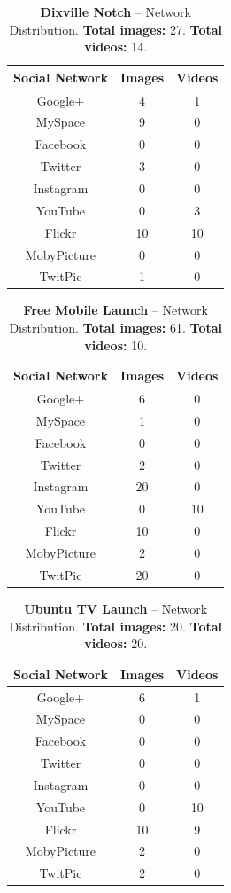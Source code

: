 \documentclass{acm_proc_article-sp}
\begin{document}
\begin{table}[htbp]
  \begin{tabular}{ | c | c | c | }
    \hline
    \textbf{Social Network} & \textbf{Images} & \textbf{Videos}\\
    \hline
    Google+ & 4 & 1\\
    MySpace & 9 & 0\\
    Facebook & 0 & 0\\
    Twitter & 3 & 0\\
    Instagram & 0 & 0\\
    YouTube & 0 & 3\\
    Flickr & 10 & 10\\ 
    MobyPicture & 0 & 0\\
    TwitPic & 1 & 0\\
    \hline
  \end{tabular}
  \label{tab:dixville}
  \caption{\textbf{Dixville Notch} -- Network Distribution. \textbf{Total images:} 27. \textbf{Total videos:} 14.}
\end{table}

\begin{table}[htbp]
  \begin{tabular}{ | c | c | c | }
    \hline
    \textbf{Social Network} & \textbf{Images} & \textbf{Videos}\\
    \hline
    Google+ & 6 & 0\\
    MySpace & 1 & 0\\
    Facebook & 0 & 0\\
    Twitter & 2 & 0\\
    Instagram & 20 & 0\\
    YouTube & 0 & 10\\
    Flickr & 10 & 0\\ 
    MobyPicture & 2 & 0\\
    TwitPic & 20 & 0\\
    \hline
  \end{tabular}
  \label{tab:freemobile}
  \caption{\textbf{Free Mobile Launch} -- Network Distribution. \textbf{Total images:} 61. \textbf{Total videos:} 10.}
\end{table}

\begin{table}[htbp]
  \begin{tabular}{ | c | c | c | }
    \hline
    \textbf{Social Network} & \textbf{Images} & \textbf{Videos}\\
    \hline
    Google+ & 6 & 1\\
    MySpace & 0 & 0\\
    Facebook & 0 & 0\\
    Twitter & 0 & 0\\
    Instagram & 0 & 0\\
    YouTube & 0 & 10\\
    Flickr & 10 & 9\\ 
    MobyPicture & 2 & 0\\
    TwitPic & 2 & 0\\
    \hline
  \end{tabular}
  \label{tab:ubuntutv}
  \caption{\textbf{Ubuntu TV Launch} -- Network Distribution. \textbf{Total images:} 20. \textbf{Total videos:} 20.}
\end{table}
\end{document}
